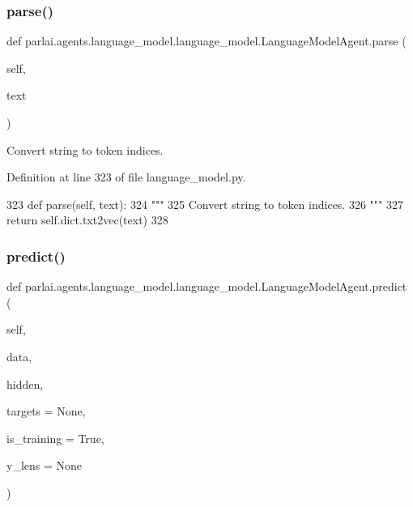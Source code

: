 \subsubsection{\texorpdfstring{parse()}{parse()}}
{\footnotesize\ttfamily def parlai.\+agents.\+language\+\_\+model.\+language\+\_\+model.\+Language\+Model\+Agent.\+parse (\begin{DoxyParamCaption}\item[{}]{self,  }\item[{}]{text }\end{DoxyParamCaption})}

\begin{DoxyVerb}Convert string to token indices.
\end{DoxyVerb}
 

Definition at line 323 of file language\+\_\+model.\+py.


\begin{DoxyCode}
323     \textcolor{keyword}{def }parse(self, text):
324         \textcolor{stringliteral}{"""}
325 \textcolor{stringliteral}{        Convert string to token indices.}
326 \textcolor{stringliteral}{        """}
327         \textcolor{keywordflow}{return} self.dict.txt2vec(text)
328 
\end{DoxyCode}
\mbox{\label{classparlai_1_1agents_1_1language__model_1_1language__model_1_1LanguageModelAgent_a1ff4e6849d50eb9d58a2f97a91d715ce}} 
\subsubsection{\texorpdfstring{predict()}{predict()}}
{\footnotesize\ttfamily def parlai.\+agents.\+language\+\_\+model.\+language\+\_\+model.\+Language\+Model\+Agent.\+predict (\begin{DoxyParamCaption}\item[{}]{self,  }\item[{}]{data,  }\item[{}]{hidden,  }\item[{}]{targets = {\ttfamily None},  }\item[{}]{is\+\_\+training = {\ttfamily True},  }\item[{}]{y\+\_\+lens = {\ttfamily None} }\end{DoxyParamCaption})}

